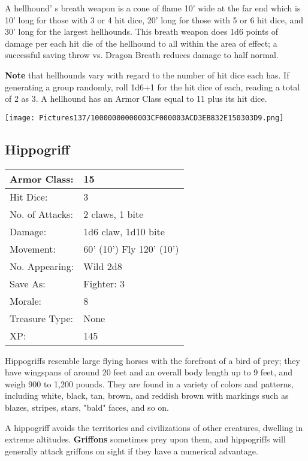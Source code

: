 \documentclass[a4paper,twoside,openany,10pt]{book}
\begin{document}
\begin{multicols}{2}
A hellhound' s breath weapon is a cone of flame 10' wide at the far end which is 10' long for those with 3 or 4 hit dice, 20' long for those with 5 or 6 hit dice, and 30' long for the largest hellhounds. This breath weapon does 1d6 points of damage per each hit die of the hellhound to all within the area of effect; a successful saving throw vs. Dragon Breath reduces damage to half normal. 

\textbf{Note} that hellhounds vary with regard to the number of hit dice each has. If generating a group randomly, roll 1d6+1 for the hit dice of each, reading a total of 2 as 3. A hellhound has an Armor Class equal to 11 plus its hit dice.


\begin{center}
	\texttt{[image: Pictures137/10000000000003CF000003ACD3EB832E150303D9.png]}
\end{center}

\subsection*{Hippogriff}\label{hippogriff}

\begin{tabularx}{0.48\textwidth}{@{}lX@{}}
Armor Class: & 15 \\\hline
Hit Dice: & 3 \\\hline
No. of Attacks: & 2 claws, 1 bite \\\hline
Damage: & 1d6 claw, 1d10 bite \\\hline
Movement: & 60' (10') Fly
120' (10') \\\hline
No. Appearing: & Wild 2d8 \\\hline
Save As: & Fighter: 3 \\\hline
Morale: & 8 \\\hline
Treasure Type: & None \\\hline
XP: & 145 \\\hline
\end{tabularx}\medskip

Hippogriffs resemble large flying horses with the forefront of a bird of prey; they have wingspans of around 20 feet and an overall body length up to 9 feet, and weigh 900 to 1,200 pounds. They are found in a variety of colors and patterns, including white, black, tan, brown, and reddish brown with markings such as blazes, stripes, stars, "bald" faces, and so on.

A hippogriff avoids the territories and civilizations of other creatures, dwelling in extreme altitudes. \textbf{Griffons} sometimes prey upon them, and hippogriffs will generally attack griffons on sight if they have a numerical advantage.


\end{multicols}
\end{document}
